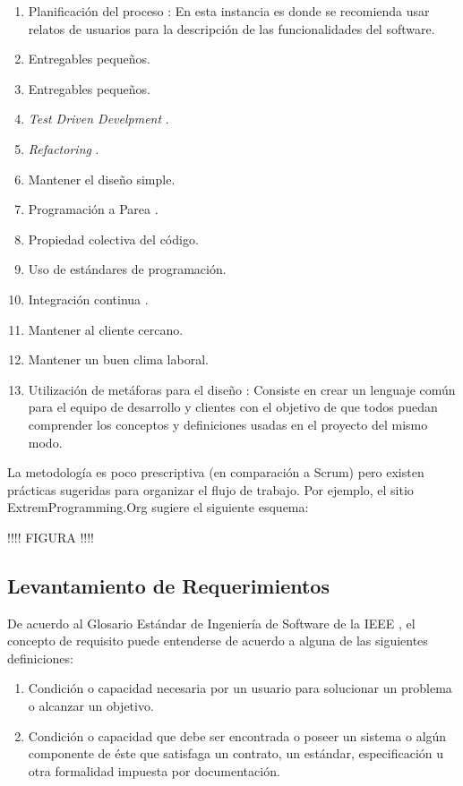 \begin{enumerate}
  \item Planificación del proceso : En esta instancia es donde se recomienda usar relatos de usuarios para la descripción de las funcionalidades del software.
  \item Entregables pequeños.
  \item Entregables pequeños.
  \item \textit{Test Driven Develpment} .
  \item \textit{Refactoring} .
  \item Mantener el diseño simple.
  \item Programación a Parea .
  \item Propiedad colectiva del código.
  \item Uso de estándares de programación.
  \item Integración continua .
  \item Mantener al cliente cercano.
  \item Mantener un buen clima laboral.
  \item Utilización de metáforas para el diseño : Consiste en crear un lenguaje común para el equipo de desarrollo y clientes con el objetivo de que todos puedan comprender los conceptos y definiciones usadas en el proyecto del mismo modo.
\end{enumerate}

La metodología es poco prescriptiva (en comparación a Scrum) pero existen prácticas sugeridas para organizar el flujo de trabajo. Por ejemplo, el sitio ExtremProgramming.Org sugiere el siguiente esquema:

!!!! FIGURA !!!!

\subsection{Levantamiento de Requerimientos \label{sec:requirements}}

De acuerdo al Glosario Estándar de Ingeniería de Software de la IEEE \cite{ieee_glosary}, el concepto de requisito puede entenderse de acuerdo a alguna de las siguientes definiciones:

\begin{enumerate}
  \item Condición o capacidad necesaria por un usuario para solucionar un problema o alcanzar un objetivo.
  \item Condición o capacidad que debe ser encontrada o poseer un sistema o algún componente de éste que satisfaga un contrato, un estándar, especificación u otra formalidad impuesta por documentación.
\end{enumerate}

